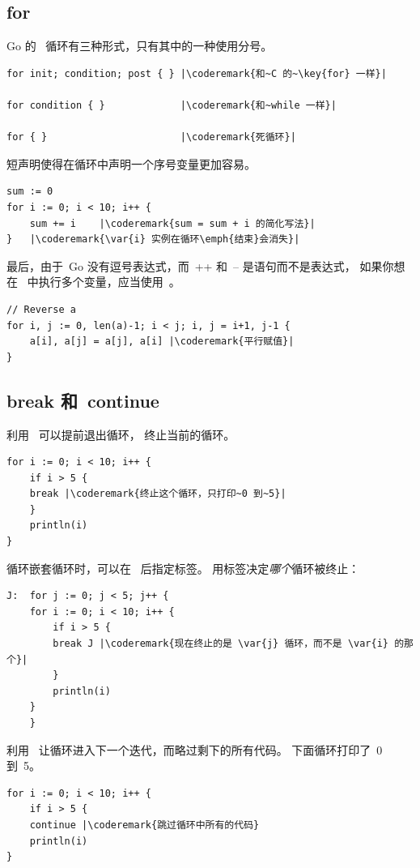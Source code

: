 \subsection{for}
\label{sec:for}
Go 的~ 循环有三种形式，只有其中的一种使用分号。
\begin{lstlisting}
for init; condition; post { } |\coderemark{和~C 的~\key{for} 一样}|

for condition { }             |\coderemark{和~while 一样}|

for { }                       |\coderemark{死循环}|
\end{lstlisting}
短声明使得在循环中声明一个序号变量更加容易。
\begin{lstlisting}
sum := 0
for i := 0; i < 10; i++ {
    sum += i	|\coderemark{sum = sum + i 的简化写法}|
}   |\coderemark{\var{i} 实例在循环\emph{结束}会消失}|
\end{lstlisting}
最后，由于~Go 没有逗号表达式，而~++ 和~-- 是语句而不是表达式，
如果你想在~ 中执行多个变量，应当使用~。
\begin{lstlisting}
// Reverse a
for i, j := 0, len(a)-1; i < j; i, j = i+1, j-1 {
    a[i], a[j] = a[j], a[i] |\coderemark{平行赋值}|
}
\end{lstlisting}

\subsection{break 和~continue}
利用~ 可以提前退出循环， 终止当前的循环。
\begin{lstlisting}
for i := 0; i < 10; i++ {
    if i > 5 {
	break |\coderemark{终止这个循环，只打印~0 到~5}|
    }
    println(i)
}
\end{lstlisting}
循环嵌套循环时，可以在~ 后指定标签。
用标签决定\emph{哪个}循环被终止：
\begin{lstlisting}
J:  for j := 0; j < 5; j++ {
	for i := 0; i < 10; i++ {
	    if i > 5 { 
		break J	|\coderemark{现在终止的是 \var{j} 循环，而不是 \var{i} 的那个}|
	    }
	    println(i)
	}
    } 
\end{lstlisting}

利用~ 让循环进入下一个迭代，而略过剩下的所有代码。
下面循环打印了~0 到~5。
\begin{lstlisting}
for i := 0; i < 10; i++ {
    if i > 5 {
	continue |\coderemark{跳过循环中所有的代码}
    println(i)
}
\end{lstlisting}

